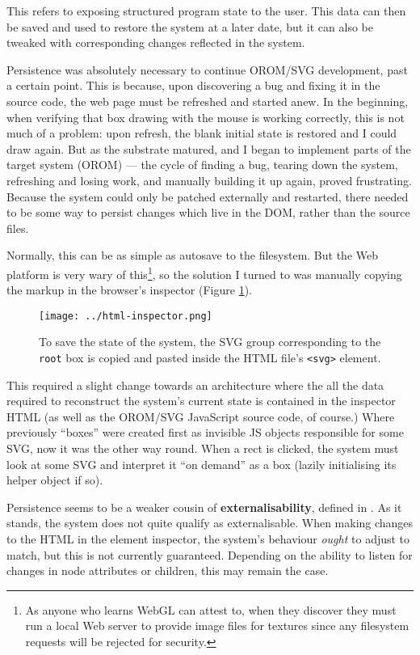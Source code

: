 This refers to exposing structured program state to the user. This data
can then be saved and used to restore the system at a later date, but it
can also be tweaked with corresponding changes reflected in the system.

Persistence was absolutely necessary to continue OROM/SVG development,
past a certain point. This is because, upon discovering a bug and fixing
it in the source code, the web page must be refreshed and started anew.
In the beginning, when verifying that box drawing with the mouse is
working correctly, this is not much of a problem: upon refresh, the
blank initial state is restored and I could draw again. But as the
substrate matured, and I began to implement parts of the target system
(OROM) --- the cycle of finding a bug, tearing down the system,
refreshing and losing work, and manually building it up again, proved
frustrating. Because the system could only be patched externally and
restarted, there needed to be some way to persist changes which live in
the DOM, rather than the source files.

Normally, this can be as simple as autosave to the filesystem. But the
Web platform is very wary of this\footnote{As anyone who learns WebGL
  can attest to, when they discover they must run a local Web server to
  provide image files for textures since any filesystem requests will be
  rejected for security.}, so the solution I turned to was manually
copying the markup in the browser's inspector (Figure
\ref{fig:html-inspector}).

\begin{figure}[h]
  \centering
  \texttt{[image: ../html-inspector.png]}
  \caption{To save the state of the system, the SVG group corresponding to the \texttt{root} box is copied and pasted inside the HTML file's \texttt{\textless{}svg\textgreater{}} element.\label{fig:html-inspector}}
\end{figure}

This required a slight change towards an architecture where the all the
data required to reconstruct the system's current state is contained in
the inspector HTML (as well as the OROM/SVG JavaScript source code, of
course.) Where previously ``boxes'' were created first as invisible JS
objects responsible for some SVG, now it was the other way round. When a
rect is clicked, the system must look at some SVG and interpret it ``on
demand'' as a box (lazily initialising its helper object if so).

Persistence seems to be a weaker cousin of \textbf{externalisability},
defined in \cite{externalise}. As it stands, the system does not quite
qualify as externalisable. When making changes to the HTML in the
element inspector, the system's behaviour \emph{ought} to adjust to
match, but this is not currently guaranteed. Depending on the ability to
listen for changes in node attributes or children, this may remain the
case.

